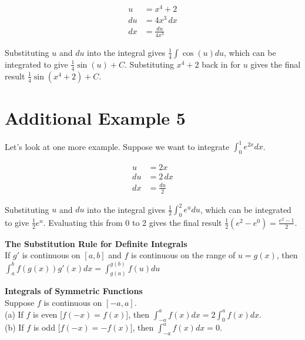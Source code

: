 \documentclass{article}
\begin{document}
\begin{align*}
    u &= x^4 + 2 \\
    du &= 4x^3 \, dx \\
    dx &= \frac{du}{4x^3}
\end{align*}

Substituting $u$ and $du$ into the integral gives $\frac{1}{4} \int \cos(u) du$, which can be integrated to give $\frac{1}{4} \sin(u) + C$. Substituting $x^4 + 2$ back in for $u$ gives the final result $\frac{1}{4} \sin(x^4 + 2) + C$.

\section{Additional Example 5}
Let's look at one more example. Suppose we want to integrate $\int_0^1 e^{2x} dx$.

\begin{align*}
    u &= 2x \\
    du &= 2 \, dx \\
    dx &= \frac{du}{2}
\end{align*}

Substituting $u$ and $du$ into the integral gives $\frac{1}{2} \int_0^2 e^u du$, which can be integrated to give $\frac{1}{2}e^u$. Evaluating this from 0 to 2 gives the final result $\frac{1}{2}(e^2 - e^0) = \frac{e^2 - 1}{2}$.
\begin{tcolorbox}[colback=red!5!white,colframe=red!75!black]
    \begin{center}
      \textbf{The Substitution Rule for Definite Integrals} \\
      If $g'$ is continuous on $[a, b]$ and $f$ is continuous on the range of $u = g(x)$, then $\int_a^b f(g(x)) g'(x) dx = \int_{g(a)}^{g(b)} f(u) du$
    \end{center}
  \end{tcolorbox}

  \begin{tcolorbox}[colback=red!5!white,colframe=red!75!black]
    \begin{center}
      \textbf{Integrals of Symmetric Functions} \\
      Suppose $f$ is continuous on $[-a, a]$. \\
      (a) If $f$ is even [$f(-x) = f(x)$], then $\int_{-a}^{a} f(x) dx = 2 \int_{0}^{a} f(x) dx$. \\
      (b) If $f$ is odd [$f(-x) = -f(x)$], then $\int_{-a}^{a} f(x) dx = 0$.
    \end{center}
  \end{tcolorbox}

  
\end{document}
